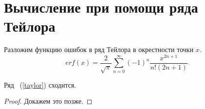 \section{Вычисление при помощи ряда Тейлора} Разложим функцию ошибок в ряд Тейлора в окрестности точки $x$.
\begin{equation}
	\label{taylor}
	erf(x) = \frac{2}{\sqrt{\pi}}\sum^{\infty}_{n = 0}(-1)^n \frac{x^{2n+1}}{n!(2n+1)}
\end{equation}
\begin{theorem}
	Ряд ~(\ref{taylor}) сходится.
\end{theorem}
\begin{proof}
	Докажем это позже.
\end{proof}

